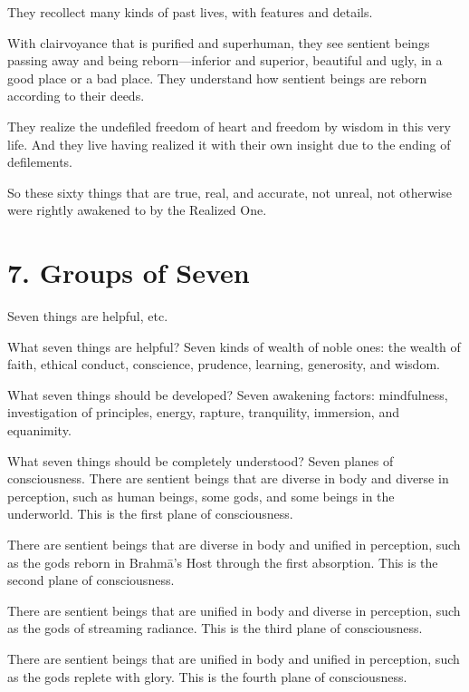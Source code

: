 \documentclass[12pt,openany]{book}%
\begin{document}
They recollect many kinds of past lives, with features and details. 

With clairvoyance that is purified and superhuman, they see sentient beings passing away and being reborn—inferior and superior, beautiful and ugly, in a good place or a bad place. They understand how sentient beings are reborn according to their deeds. 

They realize the undefiled freedom of heart and freedom by wisdom in this very life. And they live having realized it with their own insight due to the ending of defilements. 

So these sixty things that are true, real, and accurate, not unreal, not otherwise were rightly awakened to by the Realized One. 

\section*{7. Groups of Seven }

Seven things are helpful, etc. 

What seven things are helpful? Seven kinds of wealth of noble ones: the wealth of faith, ethical conduct, conscience, prudence, learning, generosity, and wisdom. 

What seven things should be developed? Seven awakening factors: mindfulness, investigation of principles, energy, rapture, tranquility, immersion, and equanimity. 

What seven things should be completely understood? Seven planes of consciousness. There are sentient beings that are diverse in body and diverse in perception, such as human beings, some gods, and some beings in the underworld. This is the first plane of consciousness. 

There are sentient beings that are diverse in body and unified in perception, such as the gods reborn in \textsanskrit{Brahmā}’s Host through the first absorption. This is the second plane of consciousness. 

There are sentient beings that are unified in body and diverse in perception, such as the gods of streaming radiance. This is the third plane of consciousness. 

There are sentient beings that are unified in body and unified in perception, such as the gods replete with glory. This is the fourth plane of consciousness. 
\end{document}
